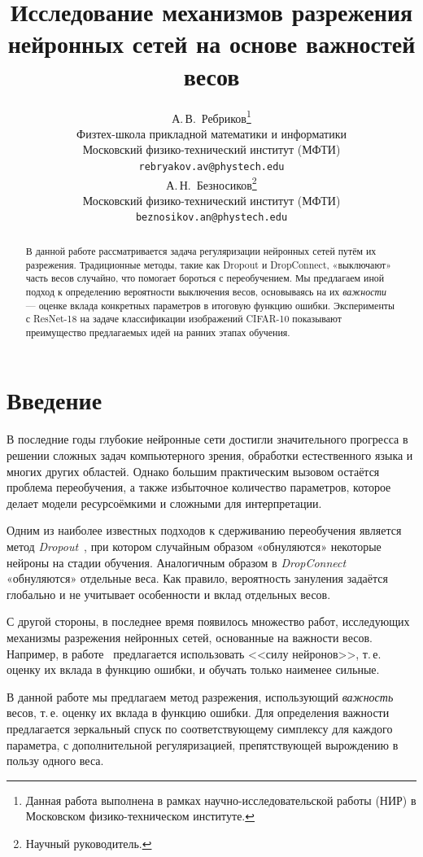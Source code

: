 \documentclass{article}
\title{Исследование механизмов разрежения нейронных сетей на основе важностей весов}
\author{%
  А.\,В.~Ребриков\thanks{Данная работа выполнена в рамках научно-исследовательской работы (НИР) в Московском физико-техническом институте.}\\
  Физтех-школа прикладной математики и информатики\\
  Московский физико-технический институт (МФТИ)\\
  \texttt{rebryakov.av@phystech.edu} \\
  \And
  А.\,Н.~Безносиков\thanks{Научный руководитель.}\\
  Московский физико-технический институт (МФТИ)\\
  \texttt{beznosikov.an@phystech.edu}
}
\date{}
\begin{document}
\maketitle

\begin{abstract}
В данной работе рассматривается задача регуляризации нейронных сетей путём их разрежения. Традиционные методы, такие как Dropout и DropConnect, «выключают» часть весов случайно, что помогает бороться с переобучением. Мы предлагаем иной подход к определению вероятности выключения весов, основываясь на их \textit{важности} --- оценке вклада конкретных параметров в итоговую функцию ошибки. Эксперименты с ResNet-18 на задаче классификации изображений CIFAR-10 показывают преимущество предлагаемых идей на ранних этапах обучения.
\end{abstract}


\section{Введение}
В последние годы глубокие нейронные сети достигли значительного прогресса в решении сложных задач компьютерного зрения, обработки естественного языка и многих других областей. Однако большим практическим вызовом остаётся проблема переобучения, а также избыточное количество параметров, которое делает модели ресурсоёмкими и сложными для интерпретации.

Одним из наиболее известных подходов к сдерживанию переобучения является метод \textit{Dropout}~\citep{srivastava2014dropout}, при котором случайным образом «обнуляются» некоторые нейроны на стадии обучения. Аналогичным образом в \textit{DropConnect}~\citep{wan2013regularization} «обнуляются» отдельные веса. Как правило, вероятность зануления задаётся глобально и не учитывает особенности и вклад отдельных весов.

С другой стороны, в последнее время появилось множество работ, исследующих механизмы разрежения нейронных сетей, основанные на важности весов. Например, в работе~\citep{keshari2019guided} предлагается использовать <<силу нейронов>>, т.\,е. оценку их вклада в функцию ошибки, и обучать только наименее сильные.

В данной работе мы предлагаем метод разрежения, использующий \textit{важность} весов, т.\,е. оценку их вклада в функцию ошибки. Для определения важности предлагается зеркальный спуск по соответствующему симплексу для каждого параметра, с дополнительной регуляризацией, препятствующей вырождению в пользу одного веса.
\end{document}
